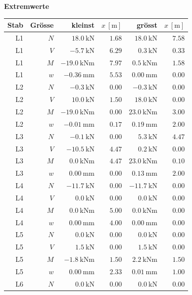 \documentclass[11pt,a4paper]{article}
\begin{document}
\noindent\textbf{Extremwerte}
\begin{longtable}{rrrrrr}
\hline
Stab & Grösse & kleinst & $x\ [\mathrm{m}]$ & grösst & $x\ [\mathrm{m}]$ \\
\hline
\endhead
L1 & $N$ & $18.0\ \mathrm{kN}$ & $1.68$ & $18.0\ \mathrm{kN}$ & $7.58$ \\
L1 & $V$ & $-5.7\ \mathrm{kN}$ & $6.29$ & $0.3\ \mathrm{kN}$ & $0.33$ \\
L1 & $M$ & $-19.0\ \mathrm{kNm}$ & $7.97$ & $0.5\ \mathrm{kNm}$ & $1.58$ \\
L1 & $w$ & $-0.36\ \mathrm{mm}$ & $5.53$ & $0.00\ \mathrm{mm}$ & $0.00$ \\
L2 & $N$ & $-0.3\ \mathrm{kN}$ & $0.00$ & $-0.3\ \mathrm{kN}$ & $0.00$ \\
L2 & $V$ & $10.0\ \mathrm{kN}$ & $1.50$ & $18.0\ \mathrm{kN}$ & $0.00$ \\
L2 & $M$ & $-19.0\ \mathrm{kNm}$ & $0.00$ & $23.0\ \mathrm{kNm}$ & $3.00$ \\
L2 & $w$ & $-0.01\ \mathrm{mm}$ & $0.17$ & $0.19\ \mathrm{mm}$ & $2.00$ \\
L3 & $N$ & $-0.1\ \mathrm{kN}$ & $0.00$ & $5.3\ \mathrm{kN}$ & $4.47$ \\
L3 & $V$ & $-10.5\ \mathrm{kN}$ & $4.47$ & $0.2\ \mathrm{kN}$ & $0.00$ \\
L3 & $M$ & $0.0\ \mathrm{kNm}$ & $4.47$ & $23.0\ \mathrm{kNm}$ & $0.10$ \\
L3 & $w$ & $0.00\ \mathrm{mm}$ & $0.00$ & $0.13\ \mathrm{mm}$ & $2.00$ \\
L4 & $N$ & $-11.7\ \mathrm{kN}$ & $0.00$ & $-11.7\ \mathrm{kN}$ & $0.00$ \\
L4 & $V$ & $0.0\ \mathrm{kN}$ & $0.00$ & $0.0\ \mathrm{kN}$ & $0.00$ \\
L4 & $M$ & $0.0\ \mathrm{kNm}$ & $5.00$ & $0.0\ \mathrm{kNm}$ & $0.00$ \\
L4 & $w$ & $0.00\ \mathrm{mm}$ & $4.00$ & $0.00\ \mathrm{mm}$ & $0.00$ \\
L5 & $N$ & $0.0\ \mathrm{kN}$ & $0.00$ & $0.0\ \mathrm{kN}$ & $0.00$ \\
L5 & $V$ & $1.5\ \mathrm{kN}$ & $0.00$ & $1.5\ \mathrm{kN}$ & $0.00$ \\
L5 & $M$ & $-1.8\ \mathrm{kNm}$ & $1.50$ & $2.2\ \mathrm{kNm}$ & $1.50$ \\
L5 & $w$ & $0.00\ \mathrm{mm}$ & $2.33$ & $0.01\ \mathrm{mm}$ & $1.00$ \\
L6 & $N$ & $0.0\ \mathrm{kN}$ & $0.00$ & $0.0\ \mathrm{kN}$ & $0.00$ \\

\end{longtable}
\end{document}
